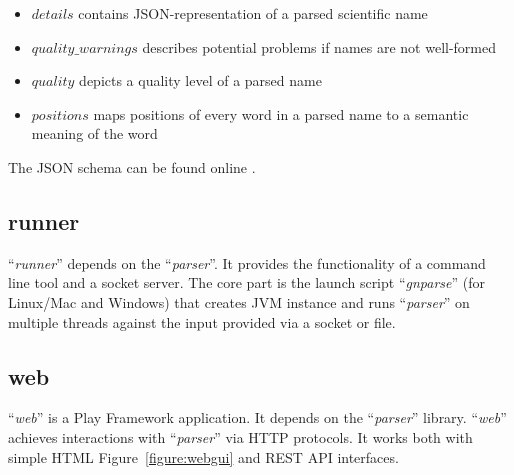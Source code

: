 \documentclass{bmcart}
\begin{document}
\begin{itemize}
  \item $details$ contains JSON-representation of a parsed scientific name
  \item $quality\_warnings$ describes potential problems if names are not
    well-formed
  \item $quality$ depicts a quality level of a parsed name
  \item $positions$ maps positions of every word in a parsed name to
    a semantic meaning of the word
\end{itemize}


The JSON schema can be found online \cite{gnparser-json}.

\subsection*{runner}

``\textit{runner}'' depends on the ``\textit{parser}''. It provides the functionality
of a command line tool and a socket server. The core part is the launch script
``\textit{gnparse}'' (for Linux/Mac and Windows) that creates JVM
instance and runs ``\textit{parser}'' on multiple threads against the input
provided via a socket or file.

\subsection*{web}

``\textit{web}'' is a Play Framework \cite{wampler2011scala} application. It
depends on the ``\textit{parser}'' library. ``\textit{web}'' achieves interactions with ``\textit{parser}'' via HTTP protocols. It works both with simple HTML
Figure~\ref{figure:webgui} and REST API interfaces.
\end{document}
